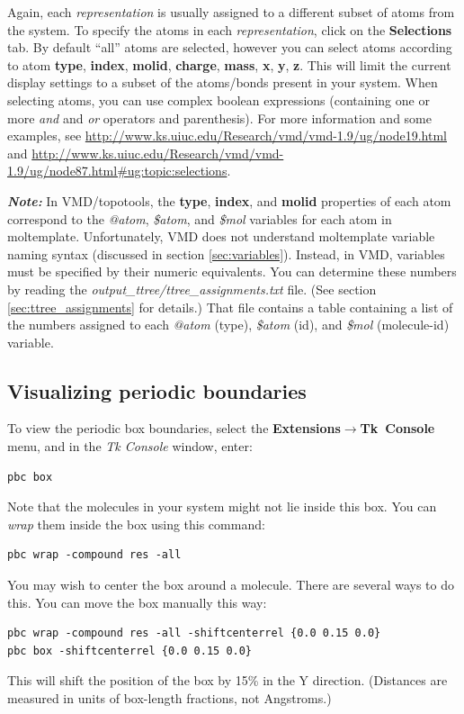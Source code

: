 \documentclass[11pt]{article}
\begin{document}
Again, each \textit{representation} is usually assigned to
a different subset of atoms from the system.
To specify the atoms in each \textit{representation}, 
click on the \mbox{\textbf{Selections}} tab.
By default ``all''
atoms are selected, however you can select atoms according to atom 
\textbf{type}, \textbf{index}, \textbf{molid}, 
\textbf{charge}, \textbf{mass}, \textbf{x}, \textbf{y}, \textbf{z}.
This will limit the current display settings to a 
subset of the atoms/bonds present in your system.
When selecting atoms, you can use complex boolean expressions 
(containing one or more \textit{and} and \textit{or} operators 
and parenthesis).
For more information and some examples, 
see \url{http://www.ks.uiuc.edu/Research/vmd/vmd-1.9/ug/node19.html}
and
\url{http://www.ks.uiuc.edu/Research/vmd/vmd-1.9/ug/node87.html#ug:topic:selections}.


\textit{\textbf{Note:}}
In VMD/topotools, 
the \textbf{type}, \textbf{index}, and \textbf{molid} 
properties of each atom correspond 
to the \textit{@atom}, \textit{\$atom}, and \textit{\$mol} 
variables for each atom in moltemplate.
Unfortunately, VMD does not understand moltemplate variable naming syntax
(discussed in section \ref{sec:variables}). 
Instead, in VMD, variables must be 
specified by their numeric equivalents. 
You can determine these numbers by reading the 
\textit{output\_ttree/ttree\_assignments.txt} file.
(See section \ref{sec:ttree_assignments} for details.)
That file contains a table containing a list of the
numbers assigned to each \textit{@atom} (type), \textit{\$atom} (id),
and \textit{\$mol} (molecule-id) variable.





\subsection{Visualizing periodic boundaries}
\label{sec:vmd_pbc}
To view the periodic box boundaries, 
select the \textbf{Extensions}$\rightarrow$\mbox{\textbf{Tk Console}} menu,
and in the \textit{Tk Console} window, enter:
\begin{verbatim}
pbc box
\end{verbatim}
Note that the molecules in your system might not lie inside this box.
You can \textit{wrap} them inside the box using this command:
\begin{verbatim}
pbc wrap -compound res -all
\end{verbatim}
You may wish to center the box around a molecule.  There are several ways to
do this.  You can move the box manually this way:
\begin{verbatim}
pbc wrap -compound res -all -shiftcenterrel {0.0 0.15 0.0}
pbc box -shiftcenterrel {0.0 0.15 0.0}
\end{verbatim}
This will shift the position of the box by 15\% in the Y direction.
(Distances are measured in units of box-length fractions, not Angstroms.)
\end{document}
